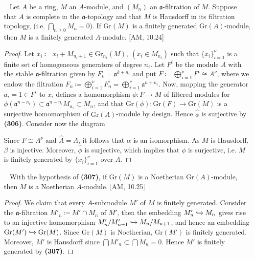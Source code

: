 \documentclass[12pt,a4paper,footinclude=true,headinclude=true]{scrbook} %
\newenvironment{proposition}[2][]
{\renewcommand\theinnercustomprop{#2}\innercustomprop[#1] 
\begin{mdframed}[backgroundcolor=gray!20]\ }
{\end{mdframed}\endinnercustomprop}
\newenvironment{corollary}[2][]
{\renewcommand\theinnercustomcol{#2}\innercustomcol[#1]
\begin{mdframed}[backgroundcolor=gray!20]\ }
{\end{mdframed}\endinnercustomcol}
\begin{document}
\begin{proposition}{307}
    Let $A$ be a ring, $M$ an $A$-module, and $(M_n)$ an $\mathfrak{a}$-filtration of $M$. Suppose that $A$ is complete in the $\mathfrak{a}$-topology and that $M$ is Hausdorff in its filtration topology, (i.e. $\bigcap_{n\geq0}M_n=0$). If $\mathrm{Gr}(M)$ is a finitely generated $\mathrm{Gr}(A)$-module, then $M$ is a finitely generated $A$-module. [AM, 10.24]
\end{proposition}
\begin{proof}
    Let $\overline{x}_i\coloneqq x_i+M_{n_i+1}\in\mathrm{Gr}_{n_i}(M),\ (x_i\in M_{n_i})$ such that $\{\overline{x}_i\}_{i=1}^\nu$ is a finite set of homogeneous generators of degree $n_i$. Let $F^i$ be the module $A$ with the stable $\mathfrak{a}$-filtration given by $F_k^i=\mathfrak{a}^{k+n_i}$ and put $F\coloneqq\bigoplus_{i=1}^{\nu}F^i\cong A^\nu$, where we endow the filtration $F_n\coloneqq\bigoplus_{i=1}^{\nu}F_n^i=\bigoplus_{i=1}^{\nu}\mathfrak{a}^{n+n_i}$. Now, mapping the generator $a_i=1\in F^i$ to $x_i$ defines a homomorphism $\phi:F\to M$ of filtered modules for $\phi(\mathfrak{a}^{n-n_i})\subset\mathfrak{a}^{n-n_i}M_{n_i}\subset M_n$, and that $\mathrm{Gr}(\phi):\mathrm{Gr}(F)\to\mathrm{Gr}(M)$ is a surjective homomorphism of $\mathrm{Gr}(A)$-module by design. Hence $\widehat{\phi}$ is surjective by \textbf{(306)}. Consider now the diagram
    \begin{center}
    \end{center}
     Since $F\cong A^\nu$ and $\widehat{A}=A$, it follows that $\alpha$ is an isomorphism. As $M$ is Hausdorff, $\beta$ is injective. Moreover, $\widehat{\phi}$ is surjective, which implies that $\phi$ is surjective, i.e. $M$ is finitely generated by $\{x_i\}_{i=1}^\nu$ over $A$.
\end{proof}

\begin{corollary}{308}
    With the hypothesis of \textbf{(307)}, if $\mathrm{Gr}(M)$ is a Noetherian $\mathrm{Gr}(A)$-module, then $M$ is a Noetherian $A$-module. [AM, 10.25]
\end{corollary}
\begin{proof}
    We claim that every $A$-submodule $M'$ of $M$ is finitely generated. Consider the $\mathfrak{a}$-filtration $M'_n\coloneqq M'\cap M_n$ of $M'$, then the embedding $M'_n\xhookrightarrow{} M_n$ gives rise to an injective homomorphism $M'_n/M'_{n+1}\xhookrightarrow{} M_n/M_{n+1}$, and hence an embedding $\mathrm{Gr}(M')\xhookrightarrow{}\mathrm{Gr}(M)$. Since $\mathrm{Gr}(M)$ is Noetherian, $\mathrm{Gr}(M')$ is finitely generated. Moreover, $M'$ is Hausdorff since $\bigcap M'_n\subset\bigcap M_n=0$. Hence $M'$ is finitely generated by \textbf{(307)}.
\end{proof}
\end{document}
